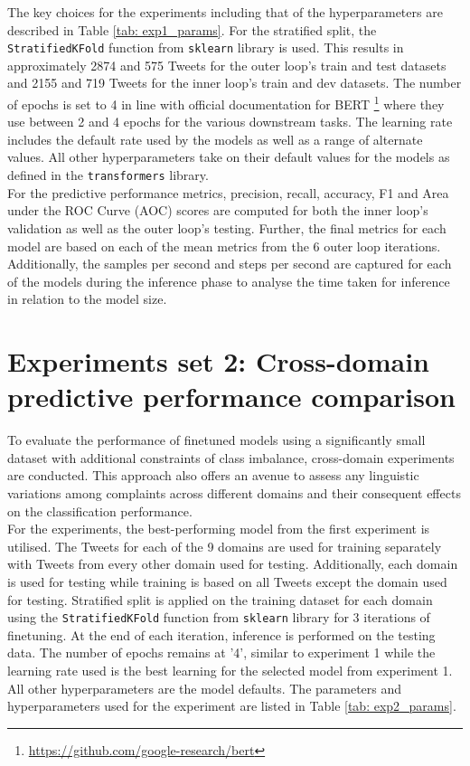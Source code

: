 The key choices for the experiments including that of the hyperparameters are described in Table \ref{tab: exp1_params}. For the stratified split, the \texttt{StratifiedKFold} function from \texttt{sklearn} library is used. This results in approximately 2874 and 575 Tweets for the outer loop's train and test datasets and 2155 and 719 Tweets for the inner loop's train and dev datasets. The number of epochs is set to 4 in line with official documentation for BERT \footnote{\url{https://github.com/google-research/bert}} where they use between 2 and 4 epochs for the various downstream tasks. The learning rate includes the default rate used by the models as well as a range of alternate values. All other hyperparameters take on their default values for the models as defined in the \texttt{transformers} library.\\

For the predictive performance metrics, precision, recall, accuracy, F1 and Area under the ROC Curve (AOC) scores are computed for both the inner loop's validation as well as the outer loop's testing. Further, the final metrics for each model are based on each of the mean metrics from the 6 outer loop iterations. Additionally, the samples per second and steps per second are captured for each of the models during the inference phase to analyse the time taken for inference in relation to the model size.

\section{Experiments set 2: Cross-domain predictive performance comparison}
To evaluate the performance of finetuned models using a significantly small dataset with additional constraints of class imbalance, cross-domain experiments are conducted. This approach also offers an avenue to assess any linguistic variations among complaints across different domains and their consequent effects on the classification performance. \\

For the experiments, the best-performing model from the first experiment is utilised. The Tweets for each of the 9 domains are used for training separately with Tweets from every other domain used for testing. Additionally, each domain is used for testing while training is based on all Tweets except the domain used for testing. Stratified split is applied on the training dataset for each domain using the \texttt{StratifiedKFold} function from \texttt{sklearn} library for 3 iterations of finetuning. At the end of each iteration, inference is performed on the testing data.  The number of epochs remains at '4', similar to experiment 1 while the learning rate used is the best learning for the selected model from experiment 1. All other hyperparameters are the model defaults. The parameters and hyperparameters used for the experiment are listed in Table \ref{tab: exp2_params}.\\

